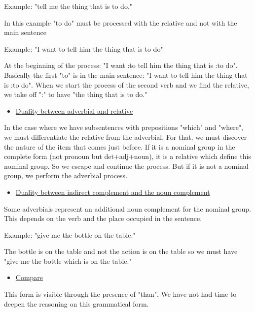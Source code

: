 \documentclass[twoside,a4paper,10pt]{report}
\begin{document}
\small
\begin{verbatimtab}
  Example: "tell me the thing that is to do."
\end{verbatimtab}
\normalsize
In this example "to do" must be processed with the relative and not with the main sentence


\small
\begin{verbatimtab}
  Example: "I want to tell him the thing that is to do"
\end{verbatimtab}
\normalsize
At the beginning of the process: "I want :to tell him the thing that is :to do". Basically the first "to" is in the main sentence: "I want to tell him the thing that is :to do". When we start the process of the second verb and we find the relative, we take off ":" to have "the thing that is to do."



\begin{itemize}
    \item  \underline{Duality between adverbial and relative}
\end{itemize}
In the case where we have subsentences with prepositions "which" and "where", we must differentiate the relative from the adverbial. For that, we must discover the nature of the item that comes just before. If it is a nominal group in the complete form (not pronoun but det+adj+noun), it is a relative which define this nominal group. So we escape and continue the process. But if it is not a nominal group, we perform the adverbial process.



\begin{itemize}
    \item  \underline{Duality between indirect complement and the noun complement}
\end{itemize}
Some adverbials represent an additional noun complement for the nominal group. This depends on the verb and the place occupied in the sentence.


\small
\begin{verbatimtab}
  Example: "give me the bottle on the table."
\end{verbatimtab}
\normalsize
The bottle is on the table and not the action is on the table so we must have "give me the bottle which is on the table."



\begin{itemize}
    \item  \underline{Compare}
\end{itemize}
This form is visible through the presence of "than". We have not had time to deepen the reasoning on this grammatical form.
\end{document}
